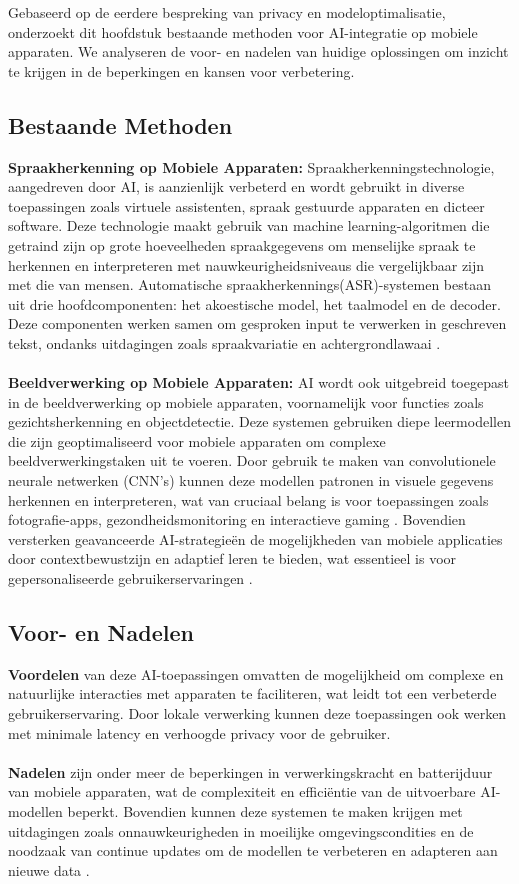 Gebaseerd op de eerdere bespreking van privacy en modeloptimalisatie, onderzoekt dit hoofdstuk bestaande methoden voor AI-integratie op mobiele apparaten. We analyseren de voor- en nadelen van huidige oplossingen om inzicht te krijgen in de beperkingen en kansen voor verbetering.

\subsection{Bestaande Methoden}

\textbf{Spraakherkenning op Mobiele Apparaten:}
Spraakherkenningstechnologie, aangedreven door AI, is aanzienlijk verbeterd en wordt gebruikt in diverse toepassingen zoals virtuele assistenten, spraak gestuurde apparaten en dicteer software. De\-ze technologie maakt gebruik van machine learning-algoritmen die getraind zijn op grote hoeveelheden spraakgegevens om menselijke spraak te herkennen en interpreteren met nauwkeurigheidsniveaus die vergelijkbaar zijn met die van mensen. Automatische spraakherkennings(ASR)-systemen bestaan uit drie hoofdcomponenten: het akoestische model, het taalmodel en de decoder. Deze componenten werken samen om gesproken input te verwerken in geschreven tekst, ondanks uitdagingen zoals spraakvariatie en achtergrondlawaai \autocite{Wang2023}.
\\ \\
\textbf{Beeldverwerking op Mobiele Apparaten:}
AI wordt ook uitgebreid toegepast in de beeldverwerking op mobiele apparaten, voornamelijk voor functies zoals gezichtsherkenning en objectdetectie. Deze systemen gebruiken diepe leermodellen die zijn geoptimaliseerd voor mobiele apparaten om complexe beeldverwerkingstaken uit te voeren. Door gebruik te maken van convolutionele neurale netwerken (CNN's) kunnen deze modellen patronen in visuele gegevens herkennen en interpreteren, wat van cruciaal belang is voor toepassingen zoals fotografie-apps, gezondheidsmonitoring en interactieve gaming \autocite{Luo2018}. Bovendien versterken geavanceerde AI-strategieën de mogelijkheden van mobiele applicaties door contextbewustzijn en adaptief leren te bieden, wat essentieel is voor gepersonaliseerde gebruikerservaringen \autocite{Sarker2021}.

\subsection{Voor- en Nadelen}

\textbf{Voordelen} van deze AI-toepassingen omvatten de mogelijkheid om complexe en natuurlijke interacties met apparaten te faciliteren, wat leidt tot een verbeterde gebruikerservaring. Door lokale verwerking kunnen deze toepassingen ook werken met minimale latency en verhoogde privacy voor de gebruiker.
\\ \\
\textbf{Nadelen} zijn onder meer de beperkingen in verwerkingskracht en batterijduur van mobiele apparaten, wat de complexiteit en efficiëntie van de uitvoerbare AI-modellen beperkt. Bovendien kunnen deze systemen te maken krijgen met uitdagingen zoals onnauwkeurigheden in moeilijke omgevingscondities en de noodzaak van continue updates om de modellen te verbeteren en adapteren aan nieuwe data \autocite{Castanyer2021}.


